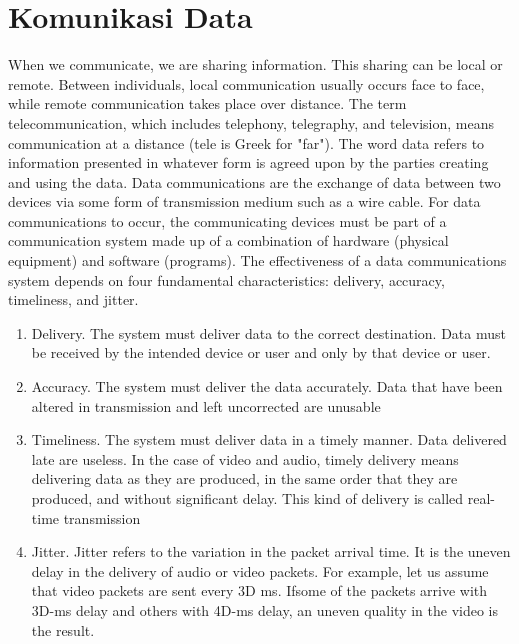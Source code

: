 \section{Komunikasi Data}
When we communicate, we are sharing information. This sharing can be local or remote. Between individuals, local communication usually occurs face to face, while remote communication takes place over distance. The term telecommunication, which includes telephony, telegraphy, and television, means communication at a distance (tele is Greek for "far"). The word data refers to information presented in whatever form is agreed upon by the parties creating and using the data. Data communications are the exchange of data between two devices via some form of transmission medium such as a wire cable. For data communications to occur, the communicating devices must be part of a communication system made up of a combination of hardware (physical equipment) and software (programs). The effectiveness of a data communications system depends on four fundamental characteristics: delivery, accuracy, timeliness, and jitter.
\begin{enumerate}
  \item Delivery. The system must deliver data to the correct destination. Data must be received by the intended device or user and only by that device or user.
  \item Accuracy. The system must deliver the data accurately. Data that have been altered in transmission and left uncorrected are unusable
  \item Timeliness. The system must deliver data in a timely manner. Data delivered late are useless. In the case of video and audio, timely delivery means delivering data as they are produced, in the same order that they are produced, and without significant delay. This kind of delivery is called real-time transmission
  \item Jitter. Jitter refers to the variation in the packet arrival time. It is the uneven delay in the delivery of audio or video packets. For example, let us assume that video packets are sent every 3D ms. Ifsome of the packets arrive with 3D-ms delay and others with 4D-ms delay, an uneven quality in the video is the result.
\end{enumerate}


